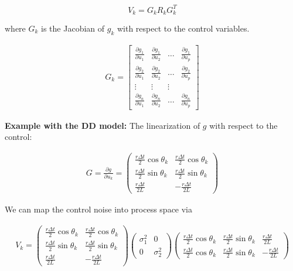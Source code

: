 \[V_k = G_k R_k G_k^T\]

where \(G_k\) is the Jacobian of \(g_k\) with respect to the control
variables.

\[\begin{aligned}
\displaystyle G_k =
  \begin{bmatrix} \frac{\partial g_1}{\partial u_1} & \frac{\partial g_1}{\partial u_2}  & \dots &
\frac{\partial g_1}{\partial u_p}  \\[8pt]
\frac{\partial g_2}{\partial u_1} & \frac{\partial g_2}{\partial u_2}  & \dots &
\frac{\partial g_2}{\partial u_p}  \\[8pt] \vdots & \vdots & \vdots \\[8pt]
\frac{\partial g_n}{\partial u_1} & \frac{\partial g_n}{\partial u_2}  & \dots &
\frac{\partial g_n}{\partial u_p}  \end{bmatrix}
\end{aligned}\]

\textbf{Example with the DD model:} The linearization of \(g\) with
respect to the control:

\[\begin{aligned}
G =  \frac{\partial g}{\partial u_{k}}=
  \left( \begin{array}{cc}\displaystyle\frac{r\Delta
      t}{2}\cos\theta_k& \displaystyle\frac{r\Delta
    t}{2}\cos\theta_k\\[8pt]\displaystyle\frac{r\Delta
    t}{2}\sin\theta_k& \displaystyle\frac{r\Delta
    t}{2}\sin\theta_k \\[8pt]
  \displaystyle\frac{r\Delta
    t}{2L}& -\displaystyle\frac{r\Delta
    t}{2L} \end{array}\right)
\end{aligned}\]

We can map the control noise into process space via

\[\begin{aligned}
V_k =
\begin{pmatrix}
\displaystyle\frac{r\Delta t}{2}\cos\theta_k& \displaystyle\frac{r\Delta t}{2}\cos\theta_k\\[8pt]
\displaystyle\frac{r\Delta t}{2}\sin\theta_k& \displaystyle\frac{r\Delta  t}{2}\sin\theta_k \\[8pt]
  \displaystyle\frac{r\Delta t}{2L}& -\displaystyle\frac{r\Delta t}{2L}
  \end{pmatrix}
\begin{pmatrix}
\sigma_1^2 & 0 \\[8pt]
0 & \sigma_2^2
\end{pmatrix}
\begin{pmatrix}
\displaystyle\frac{r\Delta t}{2}\cos\theta_k & \displaystyle\frac{r\Delta t}{2}\sin\theta_k & \displaystyle\frac{r\Delta t}{2L} \\[8pt]
\displaystyle \frac{r\Delta t}{2}\cos\theta_k &\displaystyle \frac{r\Delta  t}{2}\sin\theta_k & -\displaystyle\frac{r\Delta t}{2L}
\end{pmatrix}
\end{aligned}\]
